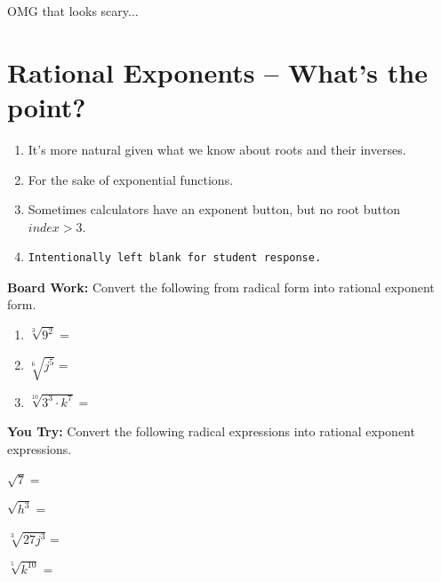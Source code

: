 \documentclass[12pt]{article}
\begin{document}
OMG that looks scary...

\pagebreak

\section{Rational Exponents -- What's the point?}

\begin{enumerate}

\item It's more natural given what we know about roots and their inverses.\\

\item For the sake of exponential functions.\\

\item Sometimes calculators have an exponent button, but no root button $index>3$.\\

\item \begin{verbatim}Intentionally left blank for student response.
\end{verbatim}
\end{enumerate}





\textbf{Board Work:} Convert the following from radical form into rational exponent form.\\

\begin{enumerate}
\setlength\itemsep{.4cm}

\item $\sqrt[3]{9^2}=$\\ 

\item $\sqrt[6]{j^5}=$\\

\item $\sqrt[10]{3^3 \cdot k^7}=$\\
\end{enumerate}

\hrulefill

\textbf{You Try:} Convert the following radical expressions into rational exponent expressions.\\

\begin{enumerate}
\begin{multicols}{2}
\setlength\itemsep{1cm}
\item $\sqrt{7}=$

\item $\sqrt{h^3}=$

\item $\sqrt[3]{27j^3}=$

\item $\sqrt[5]{k^{10}}=$


\end{multicols}
\end{enumerate}
\end{document}

